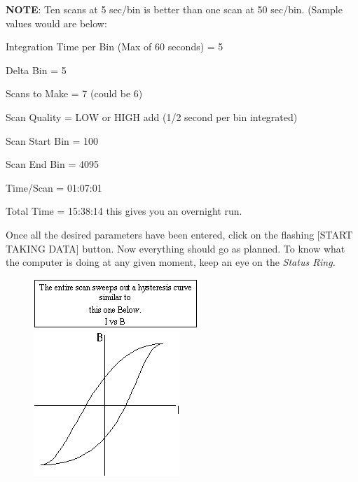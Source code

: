 \documentclass{../lab}
\begin{document}
\textbf{NOTE}: Ten scans at 5 sec/bin is better than one scan at 50 sec/bin. (Sample values would are below:

Integration Time per Bin (Max of 60 seconds) = 5

Delta Bin = 5

Scans to Make = 7 (could be 6)

Scan Quality = LOW or HIGH add (1/2 second per bin integrated)

Scan Start Bin = 100

Scan End Bin = 4095

Time/Scan = 01:07:01

Total Time = 15:38:14 this gives you an overnight run.

Once all the desired parameters have been entered, click on the flashing [START TAKING DATA] button. Now everything should go as planned. To know what the computer is doing at any given moment, keep an eye on the \emph{Status Ring.}


\begin{figure}[h]
    \centering
    \href{http://experimentationlab.berkeley.edu/sites/default/files/images/BRAimage032.gif}{\includegraphics[width=0.5\linewidth]{images/BRAimage032.png}}
    \href{http://experimentationlab.berkeley.edu/sites/default/files/images/BRAimage034.gif}{\includegraphics[width=0.5\linewidth]{images/BRAimage034.png}}
    \caption{}
\end{figure}
\end{document}
